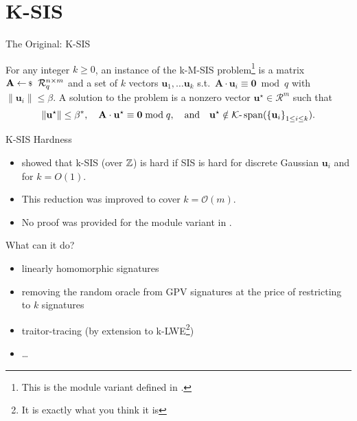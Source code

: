 \documentclass[xcolor=table,10pt,aspectratio=169]{beamer}
\renewcommand{\vec}[1]{\ensuremath{\mathbf{#1}}\xspace}
\providecommand{\mat}[1]{\ensuremath{\vec{#1}}\xspace}
\providecommand{\ring}[0]{\ensuremath{\mathcal{R}}\xspace}
\begin{document}
\section{K-SIS}
\label{sec:org3386dbe}

\begin{frame}[label={sec:org13762a4}]{The Original: K-SIS}
\begin{definition}
For any integer \(k \geq 0\), an instance of the k-M-SIS problem\footnote{This is the module variant defined in \cite{C:ACLMT22}.} is a matrix \(\mat{A} \sample \ring_{q}^{n \times m}\) and a set of \(k\) vectors \(\vec{u}_{1}, \ldots \vec{u}_{k}\) s.t. \(\mat{A}\cdot \vec{u}_{i} \equiv \vec{0} \bmod q\) with \(\|{\vec{u}_i}\| \leq \beta\). A solution to the problem is a nonzero vector \(\vec{u}^{\star} \in \ring^{m}\) such that
\[\|{\vec{u}^{\star}}\| \leq \beta^*, \quad \mat{A}\cdot \vec{u}^{\star} \equiv \vec{0} \bmod q,\quad \text{and} \quad \vec{u}^{\star} \notin \mathcal{K}\text{-}\operatorname{span}(\set{\vec{u}_i}_{1 \leq i \le k}).\]
\end{definition}

{\footnotesize {} \par}
\end{frame}

\begin{frame}[label={sec:org51ff3a0}]{K-SIS Hardness}
\begin{itemize}
\item \cite{PKC:BonFre11} showed that k-SIS (over \(\mathbb{Z}\)) is hard if SIS is hard for discrete Gaussian \(\vec{u}_{i}\) and for \(k = O(1)\).
\item This reduction was improved to cover \(k = \mathcal{O}(m)\).
\item No proof was provided for the module variant in \cite{C:ACLMT22}.
\end{itemize}
\end{frame}

\begin{frame}[label={sec:org6929cdd}]{What can it do?}
\begin{itemize}
\item linearly homomorphic signatures
\item removing the random oracle from GPV signatures at the price of restricting to \(k\) signatures
\item traitor-tracing (by extension to k-LWE\footnote{It is exactly what you think it is})
\item …
\end{itemize}
\end{frame}
\end{document}
